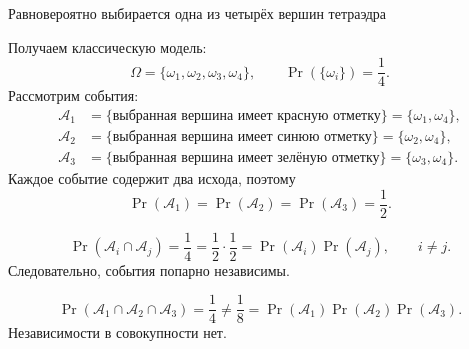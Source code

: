 \begin{example}
    Равновероятно выбирается одна из четырёх вершин тетраэдра
    \begin{center}
    \end{center}

    Получаем классическую модель:
    \[
        \Omega = \{\omega_1,\omega_2,\omega_3,\omega_4\},
        \qquad
        \Pr(\{\omega_i\}) = \frac14.
    \]
    Рассмотрим события:
    \[
        \begin{aligned}
            \mathcal{A}_1
            &= \{\text{выбранная вершина имеет красную отметку}\}
            = \{\omega_1,\omega_4\},\\
            \mathcal{A}_2
            &= \{\text{выбранная вершина имеет синюю отметку}\}
            = \{\omega_2,\omega_4\},\\
            \mathcal{A}_3
            &= \{\text{выбранная вершина имеет зелёную отметку}\}
            = \{\omega_3,\omega_4\}.
        \end{aligned}
    \]
    Каждое событие содержит два исхода, поэтому
    \[
        \Pr(\mathcal{A}_1)
        =
        \Pr(\mathcal{A}_2)
        =
        \Pr(\mathcal{A}_3)
        =
        \frac12.
    \]

    \[
        \Pr(\mathcal{A}_i \cap \mathcal{A}_j)
        =
        \frac14
        =
        \frac12 \cdot \frac12
        =
        \Pr(\mathcal{A}_i)\Pr(\mathcal{A}_j),
        \qquad i \neq j.
    \]
    Следовательно, события попарно независимы.

    \[
        \Pr(\mathcal{A}_1 \cap \mathcal{A}_2 \cap \mathcal{A}_3)
        =
        \frac14
        \neq
        \frac18
        =
        \Pr(\mathcal{A}_1)\Pr(\mathcal{A}_2)\Pr(\mathcal{A}_3).
    \]
    Независимости в совокупности нет.
\end{example}




